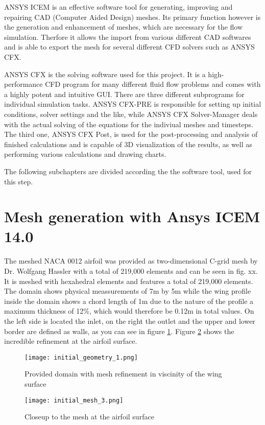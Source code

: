 ANSYS ICEM is an effective software tool for generating, improving and repairing CAD (Computer Aided Design) meshes. Its primary function however is the generation and enhancement of meshes, which are necessary for the flow simulation. Therfore it allows the import from various different CAD softwares and is able to export the mesh for several different CFD solvers such as ANSYS CFX.
	
ANSYS CFX is the solving software used for this project. It is a high-performance CFD program for many different fluid flow problems and comes with a highly potent and intuitive GUI. There are three different subprograms for individual simulation tasks. ANSYS CFX-PRE is responsible for setting up initial conditions, solver settings and the like, while ANSYS CFX Solver-Manager deals with the actual solving of the equations for the indiviual meshes and timesteps. The third one, ANSYS CFX Post, is used for the post-processing and analysis of finished calculations and is capable of 3D visualization of the results, as well as performing various calculations and drawing charts.

The following subchapters are divided according the the software tool, used for this step.
\section{Mesh generation with Ansys ICEM 14.0}
The meshed NACA 0012 airfoil was provided as two-dimensional C-grid mesh by Dr. Wolfgang Hassler with a total of 219,000 elements and can be seen in fig. xx. It is meshed with hexahedral elements and features a total of 219,000 elements. The domain shows physical meassurements of 7m by 5m while the wing profile inside the domain shows a chord length of 1m due to the nature of the profile a maximum thickness of 12\%, which would therefore be 0.12m in total values. On the left side is located the inlet, on the right the outlet and the upper and lower border are defined as walls, as you can see in figure \ref{fig:init_mesh}. Figure \ref{fig:mesh_closeup} shows the incredible refinement at the airfoil surface.
\begin{figure}[h]
\centering
\texttt{[image: initial\_geometry\_1.png]}
\caption{Provided domain with mesh refinement in viscinity of the wing surface}
\label{fig:init_mesh}
\end{figure}

\begin{figure}[h]
\centering
\texttt{[image: initial\_mesh\_3.png]}
\caption{Closeup to the mesh at the airfoil surface}
\label{fig:mesh_closeup}
\end{figure}

